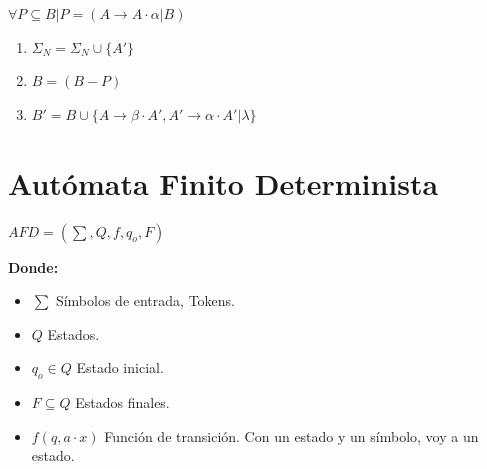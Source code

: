 \documentclass[12pt, twoside, openright]{report} %
\begin{document}
$\forall P \subseteq B | P = (A \rightarrow A \cdot \alpha | B)$
\begin{enumerate}
  \item $\Sigma_N = \Sigma_N \cup \{ A'\}$
  \item $B = (B - P)$ 
  \item $B' = B \cup \{ A \rightarrow \beta \cdot A',{ } A' \rightarrow \alpha \cdot A' | \lambda \}$
\end{enumerate}

\section{Autómata Finito Determinista}

\(AFD=( \sum, Q, f, q_o, F)\)

\textbf{Donde:}

\begin{itemize}
\item
  \(\sum\) Símbolos de entrada, Tokens.
\item
  \(Q\) Estados.
\item
  \(q_o \in Q\) Estado inicial.
\item
  \(F \subseteq Q\) Estados finales.
\item
  \(f(q,a \cdot x)\) Función de transición. Con un estado y un símbolo,
  voy a un estado.
\end{itemize}
\end{document}
